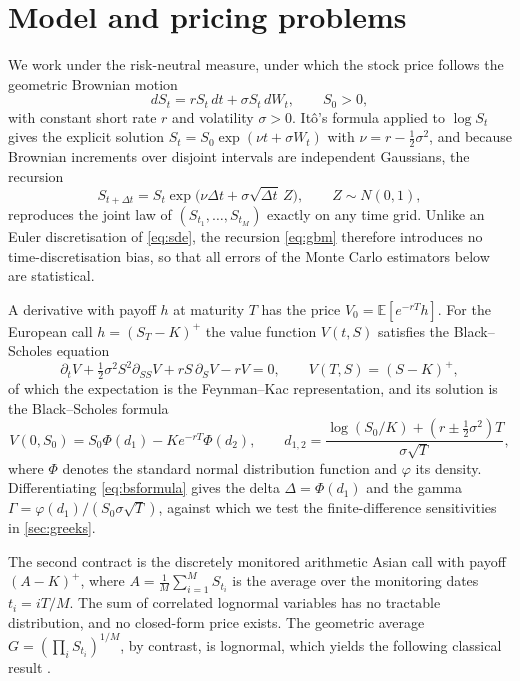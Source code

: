 \documentclass[11pt,a4paper]{article}
\newcommand{\E}{\mathbb{E}}
\begin{document}
\section{Model and pricing problems}\label{sec:model}

We work under the risk-neutral measure, under which the stock price follows the geometric Brownian motion
\begin{equation}\label{eq:sde}
dS_t = rS_t\,dt + \sigma S_t\,dW_t,\qquad S_0>0,
\end{equation}
with constant short rate $r$ and volatility $\sigma>0$.
Itô's formula applied to $\log S_t$ gives the explicit solution $S_t = S_0\exp(\nu t + \sigma W_t)$ with $\nu = r-\frac12\sigma^2$, and because Brownian increments over disjoint intervals are independent Gaussians, the recursion
\begin{equation}\label{eq:gbm}
S_{t+\Delta t} = S_t \exp\!\big(\nu\Delta t + \sigma\sqrt{\Delta t}\,Z\big),\qquad Z\sim N(0,1),
\end{equation}
reproduces the joint law of $(S_{t_1},\dots,S_{t_M})$ exactly on any time grid.
Unlike an Euler discretisation of \cref{eq:sde}, the recursion \cref{eq:gbm} therefore introduces no time-discretisation bias, so that all errors of the Monte Carlo estimators below are statistical.

A derivative with payoff $h$ at maturity $T$ has the price $V_0=\E[e^{-rT}h]$.
For the European call $h=(S_T-K)^+$ the value function $V(t,S)$ satisfies the Black--Scholes equation
\begin{equation}\label{eq:bs}
\partial_t V + \tfrac12\sigma^2 S^2 \partial_{SS}V + rS\,\partial_S V - rV = 0,\qquad V(T,S)=(S-K)^+ ,
\end{equation}
of which the expectation is the Feynman--Kac representation, and its solution is the Black--Scholes formula
\begin{equation}\label{eq:bsformula}
V(0,S_0) = S_0\Phi(d_1) - Ke^{-rT}\Phi(d_2),\qquad d_{1,2} = \frac{\log(S_0/K) + (r\pm\frac12\sigma^2)T}{\sigma\sqrt T},
\end{equation}
where $\Phi$ denotes the standard normal distribution function and $\varphi$ its density.
Differentiating \cref{eq:bsformula} gives the delta $\Delta = \Phi(d_1)$ and the gamma $\Gamma = \varphi(d_1)/(S_0\sigma\sqrt T)$, against which we test the finite-difference sensitivities in \cref{sec:greeks}.

The second contract is the discretely monitored arithmetic Asian call with payoff $(A-K)^+$, where $A=\frac1M\sum_{i=1}^M S_{t_i}$ is the average over the monitoring dates $t_i = iT/M$.
The sum of correlated lognormal variables has no tractable distribution, and no closed-form price exists.
The geometric average $G=(\prod_i S_{t_i})^{1/M}$, by contrast, is lognormal, which yields the following classical result \citep{kemna1990}.
\end{document}
